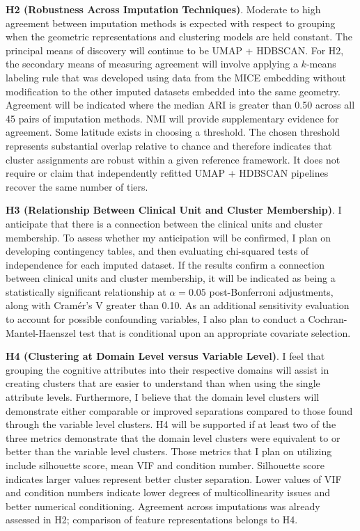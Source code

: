 \textbf{H2 (Robustness Across Imputation Techniques)}. Moderate to high agreement between imputation methods is expected with respect to grouping when the geometric representations and clustering models are held constant. The principal means of discovery will continue to be UMAP + HDBSCAN. For H2, the secondary means of measuring agreement will involve applying a \(k\)-means labeling rule that was developed using data from the MICE embedding without modification to the other imputed datasets embedded into the same geometry. Agreement will be indicated where the median ARI is greater than 0.50 across all 45 pairs of imputation methods. NMI will provide supplementary evidence for agreement. Some latitude exists in choosing a threshold. The chosen threshold represents substantial overlap relative to chance and therefore indicates that cluster assignments are robust within a given reference framework. It does not require or claim that independently refitted UMAP + HDBSCAN pipelines recover the same number of tiers.

\textbf{H3 (Relationship Between Clinical Unit and Cluster Membership)}. I anticipate that there is a connection between the clinical units and cluster membership. To assess whether my anticipation will be confirmed, I plan on developing contingency tables, and then evaluating chi-squared tests of independence for each imputed dataset. If the results confirm a connection between clinical units and cluster membership, it will be indicated as being a statistically significant relationship at \(\alpha = 0.05\) post-Bonferroni adjustments, along with Cramér's V greater than 0.10. As an additional sensitivity evaluation to account for possible confounding variables, I also plan to conduct a Cochran-Mantel-Haenszel test that is conditional upon an appropriate covariate selection.

\textbf{H4 (Clustering at Domain Level versus Variable Level)}. I feel that grouping the cognitive attributes into their respective domains will assist in creating clusters that are easier to understand than when using the single attribute levels. Furthermore, I believe that the domain level clusters will demonstrate either comparable or improved separations compared to those found through the variable level clusters. H4 will be supported if at least two of the three metrics demonstrate that the domain level clusters were equivalent to or better than the variable level clusters. Those metrics that I plan on utilizing include silhouette score, mean VIF and condition number. Silhouette score indicates larger values represent better cluster separation. Lower values of VIF and condition numbers indicate lower degrees of multicollinearity issues and better numerical conditioning. Agreement across imputations was already assessed in H2; comparison of feature representations belongs to H4.

